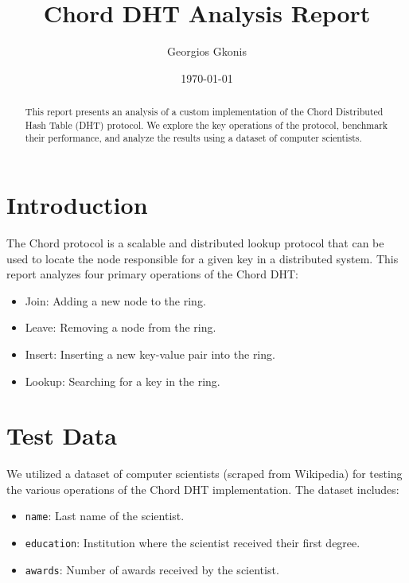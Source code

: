 \documentclass[12pt]{article}
\begin{document}
    \title{Chord DHT Analysis Report}
    \author{Georgios Gkonis}
    \date{\today}

    \maketitle

    \begin{abstract}
        This report presents an analysis of a custom implementation of the Chord Distributed Hash Table (DHT) protocol.
        We explore the key operations of the protocol, benchmark their performance, and analyze the results using a dataset of computer scientists.
    \end{abstract}


    \section{Introduction}\label{sec:introduction}
    The Chord protocol is a scalable and distributed lookup protocol that can be used to locate the node responsible for a given key in a distributed system.
    This report analyzes four primary operations of the Chord DHT:
    \begin{itemize}
        \item Join: Adding a new node to the ring.
        \item Leave: Removing a node from the ring.
        \item Insert: Inserting a new key-value pair into the ring.
        \item Lookup: Searching for a key in the ring.
    \end{itemize}


    \section{Test Data}\label{sec:test-data}
    We utilized a dataset of computer scientists (scraped from Wikipedia) for testing the various operations of the Chord DHT implementation.
    The dataset includes:
    \begin{itemize}
        \item \texttt{name}: Last name of the scientist.
        \item \texttt{education}: Institution where the scientist received their first degree.
        \item \texttt{awards}: Number of awards received by the scientist.
    \end{itemize}
\end{document}
